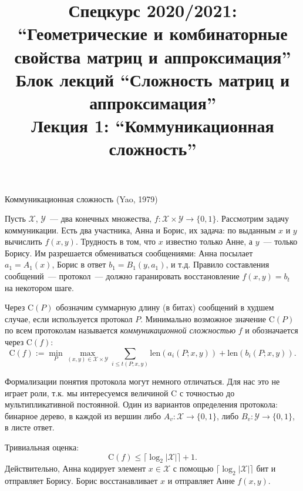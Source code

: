 \documentclass[handout]{beamer}
\title{Спецкурс 2020/2021: ``Геометрические и комбинаторные свойства матриц и
аппроксимация'' \\ Блок лекций ``Сложность матриц и аппроксимация'' \\ Лекция 1:
``Коммуникационная сложность''}
\renewcommand\le{\leqslant}
\renewcommand\C{\mathrm{C}}
\begin{document}
\maketitle

\begin{frame}{Коммуникационная сложность (Yao, 1979)}
    
    Пусть $\mathcal X$, $\mathcal Y$~--- два конечных множества,
    $f\colon\mathcal X\times\mathcal Y\to\{0,1\}$. Рассмотрим
    задачу коммуникации. Есть два участника, Анна и Борис, их задача: по
    выданным $x$ и $y$ вычислить $f(x,y)$. Трудность в том, что $x$ известно
    только Анне, а $y$~--- только Борису. Им разрешается обмениваться сообщениями:
    Анна посылает $a_1=A_1(x)$, Борис в ответ $b_1=B_1(y,a_1)$, и т.д. Правило
    составления сообщений~--- протокол~--- должно гаранировать восстановление
    $f(x,y)=b_t$ на некотором шаге.
    \pause

    Через $\C(P)$ обозначим суммарную длину (в битах) сообщений в худшем случае, если
    используется протокол $P$. Минимально возможное значение $\C(P)$ по всем
    протоколам называется \textit{коммуникационной сложностью} $f$ и обозначается через $\C(f)$:
    $$
    \C(f) := \min_P \max_{(x,y)\in\mathcal X\times\mathcal Y} \sum_{i\le t(P;x,y)}
    \mathrm{len}(a_i(P;x,y)) + \mathrm{len}(b_i(P;x,y)).
    $$
\end{frame}

\begin{frame}
    Формализации понятия протокола могут немного отличаться. Для нас это не
    играет роли, т.к. мы интересуемся величиной $\C$ с точностью до
    мультипликативной постоянной. Один из вариантов определения протокола: бинарное дерево, в каждой
    из вершин либо $A_v\colon\mathcal X\to\{0,1\}$, либо $B_v\colon\mathcal
    Y\to\{0,1\}$, в листе ответ.
    \pause\vspace{5pt}

    Тривиальная оценка:
    $$
    \C(f)\le \lceil \log_2 |\mathcal X|\rceil + 1.
    $$
    Действительно, Анна кодирует элемент $x\in\mathcal X$ с помощью 
    $\lceil \log_2 |\mathcal X|\rceil$ бит и отправляет Борису.
    Борис восстанавливает $x$ и отправляет Анне $f(x,y)$.

\end{frame}
\end{document}
